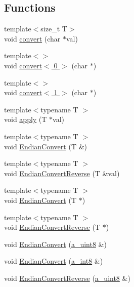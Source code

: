 \subsection*{Functions}
\begin{DoxyCompactItemize}
\item 
{\footnotesize template$<$size\+\_\+t T$>$ }\\void \hyperlink{namespace_agmd_network_a256576565cd4e7c6af28dd6e748a9787}{convert} (char $\ast$val)
\item 
{\footnotesize template$<$$>$ }\\void \hyperlink{namespace_agmd_network_a01a9dc5fb0696e41129ce692c83e872a}{convert$<$ 0 $>$} (char $\ast$)
\item 
{\footnotesize template$<$$>$ }\\void \hyperlink{namespace_agmd_network_af66f7e3604a38446e4db9bb211e4190c}{convert$<$ 1 $>$} (char $\ast$)
\item 
{\footnotesize template$<$typename T $>$ }\\void \hyperlink{namespace_agmd_network_af608360b13f761af72d9164869912d06}{apply} (T $\ast$val)
\item 
{\footnotesize template$<$typename T $>$ }\\void \hyperlink{namespace_agmd_network_a99165d18c9ba6f33bea3804804884645}{Endian\+Convert} (T \&)
\item 
{\footnotesize template$<$typename T $>$ }\\void \hyperlink{namespace_agmd_network_a081d2d71e485ae0bf18aa0640fc021b1}{Endian\+Convert\+Reverse} (T \&val)
\item 
{\footnotesize template$<$typename T $>$ }\\void \hyperlink{namespace_agmd_network_a7e4a8b775701d9d8014322307485094c}{Endian\+Convert} (T $\ast$)
\item 
{\footnotesize template$<$typename T $>$ }\\void \hyperlink{namespace_agmd_network_a4fbe4d8a3e7b7607fba261182b69189c}{Endian\+Convert\+Reverse} (T $\ast$)
\item 
void \hyperlink{namespace_agmd_network_a309788f0c4aece2e38dd96a5e00ce6a0}{Endian\+Convert} (\hyperlink{_common_defines_8h_afbe6c09973474a1f78f870f39073398f}{a\+\_\+uint8} \&)
\item 
void \hyperlink{namespace_agmd_network_af376657dd6ff37f709b06cf9a80790e5}{Endian\+Convert} (\hyperlink{_common_defines_8h_a29a7f712ca0e13d1cc6485d440fd7ca5}{a\+\_\+int8} \&)
\item 
void \hyperlink{namespace_agmd_network_a4ae57293fc2390fdf3645ad912e50c5e}{Endian\+Convert\+Reverse} (\hyperlink{_common_defines_8h_afbe6c09973474a1f78f870f39073398f}{a\+\_\+uint8} \&)

\end{DoxyCompactItemize}
